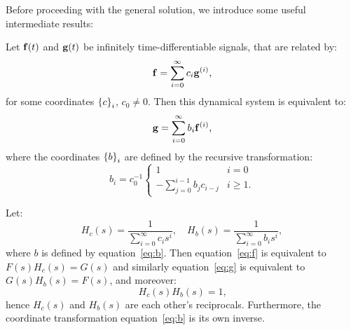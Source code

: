 Before proceeding with the general solution, we introduce some useful intermediate results:
\begin{lemma} \label{lemma:coord-transform}
Let $\mathbf{f}(t)$ and $\mathbf{g}(t)$ be infinitely time-differentiable signals, that are related by:
\begin{equation} \label{eq:f}
\mathbf{f} = \sum_{i=0}^\infty c_i \mathbf{g}^{(i)} \text{,}
\end{equation}
for some coordinates $\left\{ c \right\}_{i}$, $c_0 \ne 0$. Then this dynamical system is equivalent to:
\begin{equation} \label{eq:g}
\mathbf{g} = \sum_{i=0}^\infty b_i \mathbf{f}^{(i)} \text{,}
\end{equation}
where the coordinates $\left\{ b \right\}_{i}$ are defined by the recursive transformation:
\begin{equation} \label{eq:b}
b_i = c_0^{-1} \begin{cases}
    1 & i = 0 \\
    - \sum_{j=0}^{i-1} b_j c_{i - j} & i \ge 1 \text{.}
  \end{cases}
\end{equation}
\end{lemma}

\begin{corollary}
\label{cor:coord-transform}
Let: $$H_c(s) = \frac{1}{\sum_{i=0}^\infty c_i s^i}, \quad H_b(s) = \frac{1}{\sum_{i=0}^\infty b_i s^i}, $$ where $b$ is defined by equation~\ref{eq:b}. Then equation~\ref{eq:f} is equivalent to $F(s)H_c(s) = G(s)$ and similarly equation~\ref{eq:g} is equivalent to $G(s)H_b(s) = F(s)$, and moreover:
\begin{equation} \label{eq:inv}
H_c(s) H_b(s) = 1 \text{,}
\end{equation}
hence $H_c(s)$ and $H_b(s)$ are each other's reciprocals. Furthermore, the coordinate transformation equation~\ref{eq:b} is its own inverse.
\end{corollary}

